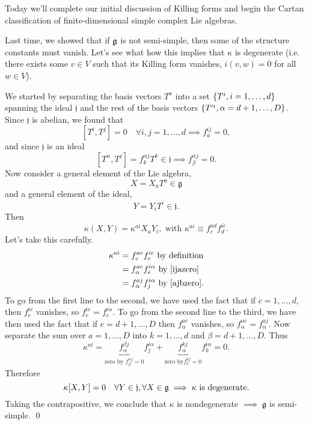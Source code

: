 Today we'll complete our initial discussion of Killing forms and begin the Cartan classification of finite-dimensional simple complex Lie algebras.

Last time, we showed that if $\mathfrak{g}$ is not semi-simple, then some of the structure constants must vanish. Let's see what how this implies that $\kappa$ is degenerate (i.e. there exists some $v\in V$ such that its Killing form vanishes, $i(v,w)=0$ for all $w\in V$).

We started by separating the basis vectors $T^a$ into a set $\{T^i,i=1,\ldots,d\}$ spanning the ideal $\mathfrak{j}$ and the rest of the basis vectors $\{T^\alpha, \alpha=d+1,\ldots, D\}$. Since $\mathfrak{j}$ is abelian, we found that
\begin{equation}\label{ijazero}
[T^i, T^j]=0\quad \forall i,j=1,\ldots,d \implies f^{ij}_a=0,
\end{equation}
and since $\mathfrak{j}$ is an ideal
\begin{equation}\label{ajbzero}
[T^\alpha, T^j]=f^{\alpha j}_k T^k\in \mathfrak{j} \implies f^{\alpha j}_\beta=0.
\end{equation}
Now consider a general element of the Lie algebra, $$X=X_a T^a \in \mathfrak{g}$$ and a general element of the ideal,
$$Y=Y_i T^i \in \mathfrak{j}.$$
Then
$$\kappa(X,Y)=\kappa^{ai}X_a Y_i,\text{ with }
\kappa^{ai}\equiv f^{ad}_c f^{ic}_d.$$
Let's take this carefully.
\begin{align*}
\kappa^{ai}&=f^{ae}_c f^{ic}_e\text{ by definition}\\
&=f^{ae}_\alpha f^{i\alpha}_e\text{ by }\ref{ijazero}\\
&=f^{aj}_\alpha f^{i\alpha}_j\text{ by }\ref{ajbzero}.
\end{align*}
To go from the first line to the second, we have used the fact that if $c=1,\ldots,d$, then $f^{ic}_e$ vanishes, so $f^{ic}_e=f^{i\alpha}_e$. To go from the second line to the third, we have then used the fact that if $e=d+1,\ldots,D$ then $f^{ae}_{\alpha}$ vanishes, so $f^{ae}_\alpha=f^{aj}_\alpha.$
Now separate the sum over $a=1,\ldots,D$ into $k=1,\ldots,d$ and $\beta=d+1,\ldots,D$.
Thus
$$\kappa^{ai}=\underbrace{f^{\beta j}_\alpha}_{\text{zero by } f^{\alpha j}_\beta=0} f^{i\alpha}_j + \underbrace{f^{kj}_\alpha}_{\text{zero by}f^{kj}_a=0} f^{i\alpha}_k=0.$$
Therefore $$\kappa[X,Y]=0 \quad\forall Y\in \mathfrak{j},\forall X \in \mathfrak{g}\implies \kappa\text{ is degenerate.}$$ Taking the contrapositive, we conclude that $\kappa$ is nondegenerate $\implies \mathfrak{g}$ is semi-simple. \qed

